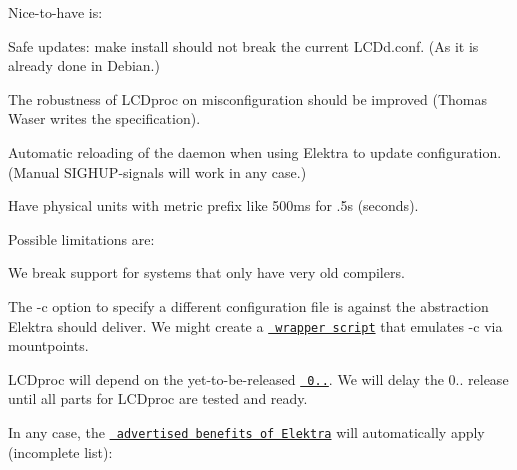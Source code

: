 Nice-\/to-\/have is\+:


\begin{DoxyItemize}
\item Safe updates\+: {\ttfamily make install} should not break the current {\ttfamily L\+C\+Dd.\+conf}. (As it is already done in Debian.)
\item The robustness of L\+C\+Dproc on misconfiguration should be improved (Thomas Waser writes the specification).
\item Automatic reloading of the daemon when using Elektra to update configuration. (Manual {\ttfamily S\+I\+G\+H\+UP}-\/signals will work in any case.)
\item Have physical units with metric prefix like {\ttfamily 500ms} for {.\+5s} (seconds).
\end{DoxyItemize}

Possible limitations are\+:


\begin{DoxyItemize}
\item We break support for systems that only have very old compilers.
\item The {\ttfamily -\/c} option to specify a different configuration file is against the abstraction Elektra should deliver. We might create a \href{https://github.com/ElektraInitiative/libelektra/issues/1416}{\texttt{ wrapper script}} that emulates {\ttfamily -\/c} via mountpoints.
\item L\+C\+Dproc will depend on the yet-\/to-\/be-\/released \href{https://github.com/ElektraInitiative/libelektra/milestone/11}{\texttt{ 0..}}. We will delay the 0.. release until all parts for L\+C\+Dproc are tested and ready.
\end{DoxyItemize}

In any case, the \href{https://www.libelektra.org}{\texttt{ advertised benefits of Elektra}} will automatically apply (incomplete list)\+:


